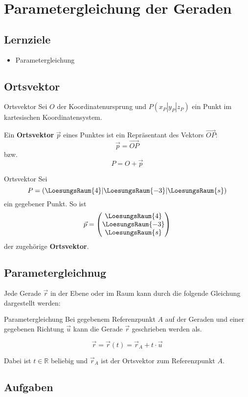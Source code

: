 \section{Parametergleichung der Geraden}

\subsection*{Lernziele}
\begin{itemize}
\item Parametergleichung
\end{itemize}

\newpage
\subsection{Ortsvektor}

\begin{definition}{Ortsvektor}{}
  Sei $O$ der Koordinatenursprung und $P(x_P|y_P|z_P)$ ein Punkt im
  kartesischen Koordinatensystem.
  
  Ein \textbf{Ortsvektor} $\vec{p}$ eines Punktes
  ist ein Repräsentant des Vektors $\overrightarrow{OP}$:
  $$\vec{p} = \overrightarrow{OP}$$
  bzw.
  $$P = O + \vec{p}$$
\end{definition}

\begin{beispiel}{Ortsvektor}{}
  Sei
  $$P=(\LoesungsRaum{4}|\LoesungsRaum{-3}|\LoesungsRaum{s})$$
  ein
gegebener Punkt. So ist
 $$\vec{p}
= \begin{pmatrix}\LoesungsRaum{4}\\\LoesungsRaum{-3}\\\LoesungsRaum{s}\end{pmatrix}$$
der zugehörige \textbf{Ortsvektor}.
\end{beispiel}

\newpage
\subsection{Parametergleichnug}
Jede Gerade $\vec{r}$ in der Ebene oder im Raum kann durch die
folgende Gleichung dargestellt werden:

\begin{definition}{Parametergleichung}{}
  Bei gegebenem Referenzpunkt $A$ auf der Geraden und einer gegebenen
  Richtung $\vec{u}$ kann die Gerade $\vec{r}$ geschrieben werden als.
  
  $$\vec{r} = \vec{r}(t) = \vec{r}_A + t\cdot{} \vec{u}$$

  Dabei ist $t\in\mathbb{R}$ beliebig und $\vec{r}_A$ ist der
  Ortsvektor zum Referenzpunkt $A$.
\end{definition}

\subsection*{Aufgaben}


\newpage%
